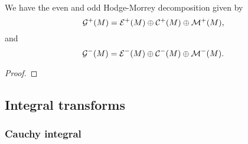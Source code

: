 \begin{theorem}
We have the even and odd Hodge-Morrey decomposition given by
\begin{equation}
\mathcal{G}^+(M) = \mathcal{E}^{+}(M) \oplus \mathcal{C}^{+}(M) \oplus \mathcal{M}^{+}(M),
\end{equation}
and
\begin{equation}
\mathcal{G}^-(M) = \mathcal{E}^{-}(M) \oplus \mathcal{C}^{-}(M) \oplus \mathcal{M}^{-}(M).
\end{equation}
\end{theorem}
\begin{proof}

\end{proof}

\subsection{Integral transforms}
\label{subsec:integral_transforms}

\subsubsection{Cauchy integral}



